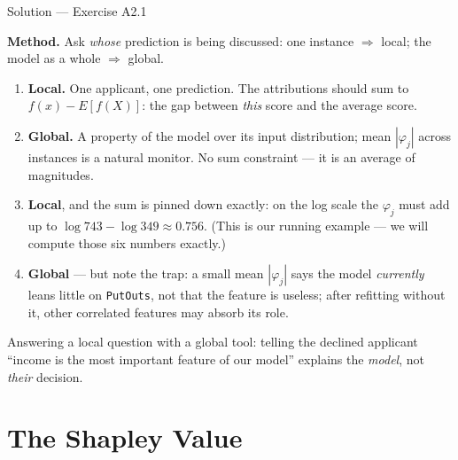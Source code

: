 \documentclass[aspectratio=169,11pt]{beamer}
\begin{document}
\begin{frame}{Solution --- Exercise A2.1}
\begin{solutionbox}
  \textbf{Method.} Ask \emph{whose} prediction is being discussed: one instance
  $\Rightarrow$ local; the model as a whole $\Rightarrow$ global.
  \begin{enumerate}
    \item \textbf{Local.} One applicant, one prediction. The attributions should sum to
          $f(x)-E[f(X)]$: the gap between \emph{this} score and the average score.
    \item \textbf{Global.} A property of the model over its input distribution;
          mean $|\varphi_j|$ across instances is a natural monitor. No sum constraint
          --- it is an average of magnitudes.
    \item \textbf{Local}, and the sum is pinned down exactly: on the log scale the
          $\varphi_j$ must add up to $\log 743 - \log 349 \approx 0.756$. (This is our
          running example --- we will compute those six numbers exactly.)
    \item \textbf{Global} --- but note the trap: a small mean $|\varphi_j|$ says the
          model \emph{currently} leans little on \texttt{PutOuts}, not that the feature
          is useless; after refitting without it, other correlated features may absorb
          its role.
  \end{enumerate}
\end{solutionbox}
\begin{mistake}
  Answering a local question with a global tool: telling the declined applicant
  ``income is the most important feature of our model'' explains the \emph{model},
  not \emph{their} decision.
\end{mistake}
\end{frame}

\section{The Shapley Value}
\end{document}
